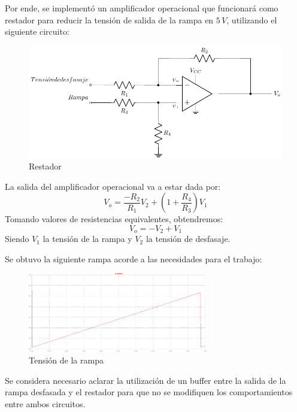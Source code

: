 Por ende, se implementó un amplificador operacional que funcionará como restador para reducir la tensión de salida de la rampa en $5\,V$, utilizando el siguiente circuito:

\begin{figure}[H]
\centering
\includegraphics[scale=0.8]{Ejercicio8/Circuitos/Restador.pdf}
\caption{Restador}
\label{fig:Restador}
\end{figure}
\par
La salida del amplificador operacional va a estar dada por:
\begin{equation}
V_o=\frac{-R_2}{R_1}V_2+\left(1+\frac{R_4}{R_3}\right)V_1
\end{equation}
Tomando valores de resistencias equivalentes, obtendremos:
\begin{equation}
V_o=-V_2+V_1
\end{equation}
Siendo $V_1$ la tensión de la rampa y $V_2$ la tensión de desfasaje.\par\par\par
Se obtuvo la siguiente rampa acorde a las necesidades para el trabajo:

\begin{figure}[H]
\centering
\includegraphics[width=0.7\textwidth]{Ejercicio8/Imagenes/Rampa}
\caption{Tensión de la rampa}
\label{fig:Generador_de_rampa_LTSpice}
\end{figure}



Se considera necesario aclarar la utilización de un buffer entre la salida de la rampa desfasada y el restador para que no se modifiquen los comportamientos entre ambos circuitos.\par


